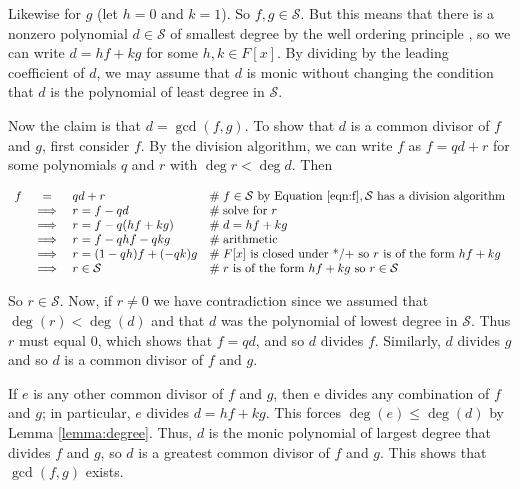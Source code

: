 \documentclass[11pt, oneside]{article}   	%
\theoremstyle{definition}
\begin{document}
\bigskip
\noindent
Likewise for $g$ (let $h = 0$ and $k = 1$). So $f,g \in \mathcal{S}$. But this means that there is a nonzero polynomial $d \in \mathcal{S}$ of 
smallest degree by the well ordering principle \cite{well_ordering_principle}, so we can write $d = hf + kg$ for some $h, k \in F [x]$. By dividing by the leading coefficient of 
$d$, we may assume that $d$ is monic without changing the  condition that $d$ is the polynomial of least degree in $\mathcal{S}$.

\bigskip
\noindent
Now the claim is that $d = \gcd(f,g)$. To show that $d$ is a common divisor of $f$ and $g$, first consider $f$. By the division algorithm, we can
write $f$ as $f = qd + r$ for some polynomials $q$ and $r$ with $\deg r < \deg d$. Then

\begin{equation}
\begin{array}{rcll}
f
&=& qd +  r                                            &\mathrel{\#}  f \in \mathcal{S} \text{ by Equation \ref{eqn:f}}, \mathcal{S} \text{ has a division algorithm} \\
&\implies & r = f  - qd                             &\mathrel{\#} \text{solve for $r$}\\
&\implies& r = f - q(hf + kg)                    &\mathrel{\#}  d = hf + kg \\
&\implies& r = f - qhf  - qkg                     &\mathrel{\#} \text{arithmetic}\\
&\implies& r = (1 - qh)f  + (-qk)g             &\mathrel{\#} F[x]  \text{ is closed under */+ so } r  \text{ is of the form } hf + kg \\
&\implies&  r \in \mathcal{S}                   &\mathrel{\#} r \text{ is of the form } hf + kg \text{ so } r \in \mathcal{S} 
\end{array}
\label{eqn:division}
\end{equation}


\bigskip
\noindent
So $r \in \mathcal{S}$. Now, if $r \neq 0$ we have contradiction since we assumed that  $\deg(r) < \deg(d)$ and that $d$ was the polynomial of lowest degree
in $\mathcal{S}$. Thus $r$ must equal $0$, which shows that $f = qd$, and so $d$ divides $f$. Similarly, $d$ divides $g$ and so $d$ is a common divisor of $f$ and $g$.

\bigskip
\noindent
If  $e$ is any other common divisor of $f$ and $g$, then e divides any combination of $f$ and $g$; in particular, $e$ divides $d= hf + kg $. 
This forces $\deg(e) \leq \deg(d)$ by Lemma \ref{lemma:degree}. Thus, $d$ is the monic polynomial of largest degree that divides $f$ and $g$, so $d$ is a greatest 
common divisor of $f$ and $g$.  This shows that $\gcd(f,g)$ exists.
\end{document}
